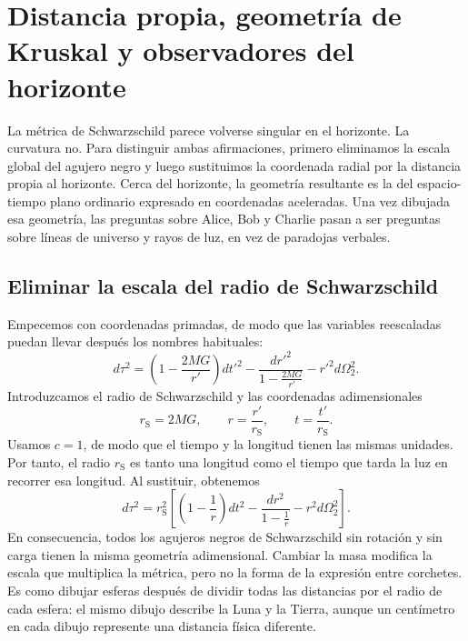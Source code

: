 \chapter{Distancia propia, geometría de Kruskal y observadores del horizonte}

La métrica de Schwarzschild parece volverse singular en el horizonte. La curvatura no. Para distinguir ambas afirmaciones, primero eliminamos la escala global del agujero negro y luego sustituimos la coordenada radial por la distancia propia al horizonte. Cerca del horizonte, la geometría resultante es la del espacio-tiempo plano ordinario expresado en coordenadas aceleradas. Una vez dibujada esa geometría, las preguntas sobre Alice, Bob y Charlie pasan a ser preguntas sobre líneas de universo y rayos de luz, en vez de paradojas verbales.

\section{Eliminar la escala del radio de Schwarzschild}

Empecemos con coordenadas primadas, de modo que las variables reescaladas puedan llevar después los nombres habituales:
\begin{equation}
d\tau^2
=
\left(1-\frac{2MG}{r'}\right)dt'^2
-
\frac{dr'^2}{1-\frac{2MG}{r'}}
-
r'^2d\Omega_2^2.
\label{eq:l7-schwarzschild-dimensional}
\end{equation}
Introduzcamos el radio de Schwarzschild y las coordenadas adimensionales
\begin{equation}
r_{\mathrm S}=2MG,
\qquad
r=\frac{r'}{r_{\mathrm S}},
\qquad
t=\frac{t'}{r_{\mathrm S}}.
\label{eq:l7-rescaling}
\end{equation}
Usamos \(c=1\), de modo que el tiempo y la longitud tienen las mismas unidades. Por tanto, el radio \(r_{\mathrm S}\) es tanto una longitud como el tiempo que tarda la luz en recorrer esa longitud. Al sustituir, obtenemos
\begin{equation}
d\tau^2
=r_{\mathrm S}^2
\left[
\left(1-\frac1r\right)dt^2
-
\frac{dr^2}{1-\frac1r}
-
r^2d\Omega_2^2
\right].
\label{eq:l7-schwarzschild-rescaled}
\end{equation}
En consecuencia, todos los agujeros negros de Schwarzschild sin rotación y sin carga tienen la misma geometría adimensional. Cambiar la masa modifica la escala que multiplica la métrica, pero no la forma de la expresión entre corchetes. Es como dibujar esferas después de dividir todas las distancias por el radio de cada esfera: el mismo dibujo describe la Luna y la Tierra, aunque un centímetro en cada dibujo represente una distancia física diferente.

